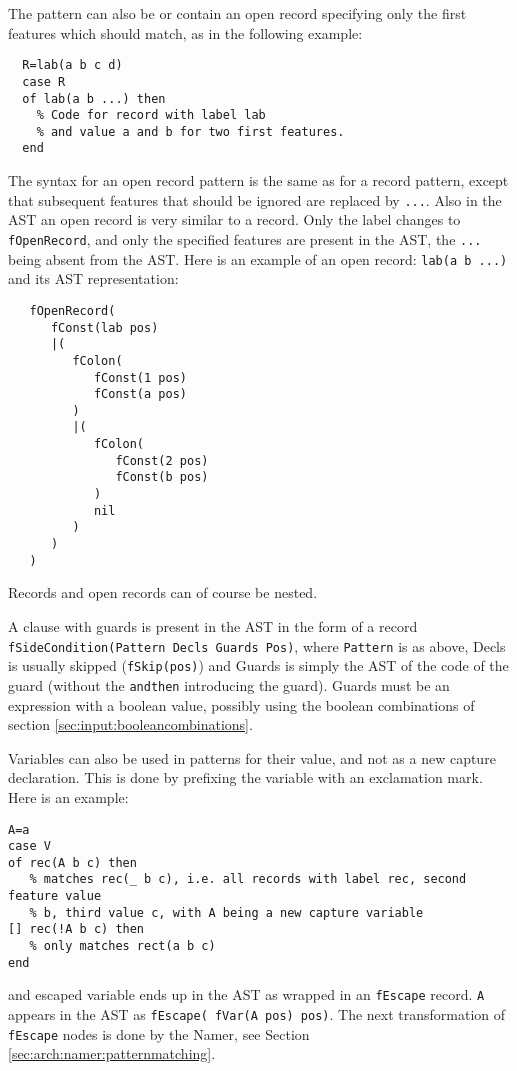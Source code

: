 \documentclass[a4paper]{memoir}
\begin{document}
The pattern can also be or contain an open record specifying only the first features which should match, as in the following example:
\begin{lstlisting}
  R=lab(a b c d)
  case R
  of lab(a b ...) then
    % Code for record with label lab
    % and value a and b for two first features.
  end
\end{lstlisting}
The syntax for an open record pattern is the same as for a record pattern, except that subsequent features that should be ignored are replaced by \lstinline!...!. Also in the AST an open record is very similar to a record. Only the label changes to \lstinline!fOpenRecord!, and only the specified features are present in the AST, the \lstinline!...! being absent from the AST. Here is an example of an open record:
\lstinline!lab(a b ...)! 
and its AST representation:
\begin{lstlisting}
   fOpenRecord(
      fConst(lab pos)
      |(
         fColon(
            fConst(1 pos)
            fConst(a pos)
         )
         |(
            fColon(
               fConst(2 pos)
               fConst(b pos)
            )
            nil
         )
      )
   )
\end{lstlisting}

Records and open records can of course be nested.

A clause with guards is present in the AST in the form of a record \lstinline!fSideCondition(Pattern Decls Guards Pos)!, where \lstinline!Pattern! is as above, Decls is usually skipped (\lstinline!fSkip(pos)!)%
and Guards is simply the AST of the code of the guard (without the \lstinline!andthen! introducing the guard).
Guards must be an expression with a boolean value, possibly using the boolean combinations of section \ref{sec:input:booleancombinations}.

Variables can also be used in patterns for their value, and not as a new capture
declaration. This is done by prefixing the variable with an exclamation mark.
Here is an example:

\begin{lstlisting}
A=a
case V
of rec(A b c) then
   % matches rec(_ b c), i.e. all records with label rec, second feature value
   % b, third value c, with A being a new capture variable
[] rec(!A b c) then
   % only matches rect(a b c)
end
\end{lstlisting}

and escaped variable ends up in the AST as wrapped in an \lstinline!fEscape!
record. \lstinline!A! appears in the AST as \lstinline!fEscape( fVar(A pos)
pos)!.
The next transformation of \lstinline!fEscape! nodes is done by the Namer, see Section \ref{sec:arch:namer:patternmatching}.
\end{document}
